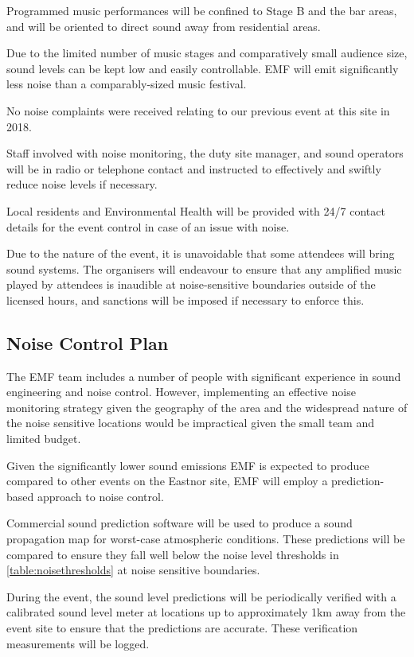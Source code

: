 Programmed music performances will be confined to Stage B and the bar areas, and
will be oriented to direct sound away from residential areas.

Due to the limited number of music stages and comparatively small audience size,
sound levels can be kept low and easily controllable. EMF will emit significantly
less noise than a comparably-sized music festival.

No noise complaints were received relating to our previous event at this site in
2018.

Staff involved with noise monitoring, the duty site manager, and sound operators
will be in radio or telephone contact and instructed to effectively and swiftly
reduce noise levels if necessary.

Local residents and Environmental Health will be provided with 24/7 contact
details for the event control in case of an issue with noise.

Due to the nature of the event, it is unavoidable that some attendees will
bring sound systems.  The organisers will endeavour to ensure that any
amplified music played by attendees is inaudible at noise-sensitive boundaries
outside of the licensed hours, and sanctions will be imposed if necessary to enforce
this.

\subsection{Noise Control Plan}
The EMF team includes a number of people with significant experience in sound 
engineering and noise control. However, implementing an effective noise monitoring
strategy given the geography of the area and the widespread nature of the noise
sensitive locations would be impractical given the small team and limited budget.

Given the significantly lower sound emissions EMF is expected to produce compared to
other events on the Eastnor site, EMF will employ a prediction-based approach to
noise control.

Commercial sound prediction software \cite{noizcalc} will be used to produce a sound
propagation map for worst-case atmospheric conditions. These predictions will be compared
to ensure they fall well below the noise level thresholds in \cref{table:noisethresholds}
at noise sensitive boundaries.

During the event, the sound level predictions will be periodically verified with a
calibrated sound level meter at locations up to approximately 1km away from the event
site to ensure that the predictions are accurate. These verification measurements will
be logged.

